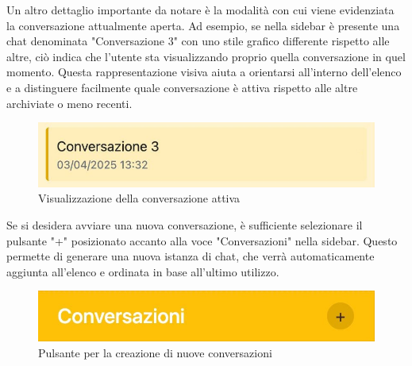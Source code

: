 Un altro dettaglio importante da notare è la modalità con cui viene evidenziata la conversazione attualmente aperta. Ad esempio, se nella sidebar è presente una chat denominata "Conversazione 3" con uno stile grafico differente rispetto alle altre, ciò indica che l’utente sta visualizzando proprio quella conversazione in quel momento. Questa rappresentazione visiva aiuta a orientarsi all’interno dell’elenco e a distinguere facilmente quale conversazione è attiva rispetto alle altre archiviate o meno recenti.
\begin{figure}[H]
\centering
\includegraphics[width=1\textwidth]{contents/img/active_conv.jpg}
\caption{Visualizzazione della conversazione attiva}
\end{figure}

Se si desidera avviare una nuova conversazione, è sufficiente selezionare il pulsante "+" posizionato accanto alla voce "Conversazioni" nella sidebar. Questo permette di generare una nuova istanza di chat, che verrà automaticamente aggiunta all'elenco e ordinata in base all'ultimo utilizzo.
\begin{figure}[H]
\centering
\includegraphics[width=1\textwidth]{contents/img/add_conv.jpg}
\caption{Pulsante per la creazione di nuove conversazioni}
\end{figure}

